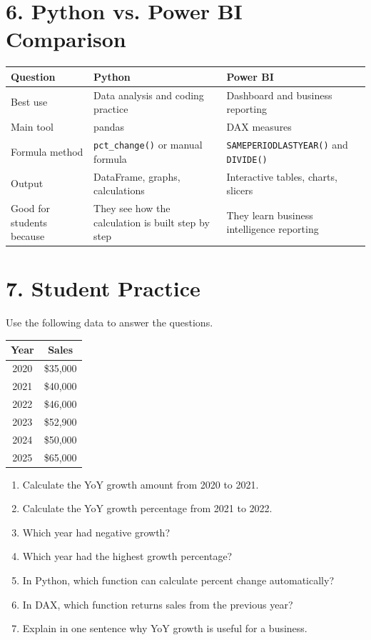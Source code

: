 \documentclass[11pt]{article}
\begin{document}
\section{6. Python vs. Power BI Comparison}
\begin{center}
\begin{tabular}{p{}p{}p{}}
\toprule
\textbf{Question} & \textbf{Python} & \textbf{Power BI} \\
\midrule
Best use & Data analysis and coding practice & Dashboard and business reporting \\
Main tool & pandas & DAX measures \\
Formula method & \texttt{pct\_change()} or manual formula & \texttt{SAMEPERIODLASTYEAR()} and \texttt{DIVIDE()} \\
Output & DataFrame, graphs, calculations & Interactive tables, charts, slicers \\
Good for students because & They see how the calculation is built step by step & They learn business intelligence reporting \\
\bottomrule
\end{tabular}
\end{center}

\section{7. Student Practice}
Use the following data to answer the questions.

\begin{center}
\begin{tabular}{cc}
\toprule
\textbf{Year} & \textbf{Sales} \\
\midrule
2020 & \$35,000 \\
2021 & \$40,000 \\
2022 & \$46,000 \\
2023 & \$52,900 \\
2024 & \$50,000 \\
2025 & \$65,000 \\
\bottomrule
\end{tabular}
\end{center}

\begin{enumerate}[itemsep=4pt]
    \item Calculate the YoY growth amount from 2020 to 2021.
    \item Calculate the YoY growth percentage from 2021 to 2022.
    \item Which year had negative growth?
    \item Which year had the highest growth percentage?
    \item In Python, which function can calculate percent change automatically?
    \item In DAX, which function returns sales from the previous year?
    \item Explain in one sentence why YoY growth is useful for a business.
\end{enumerate}
\end{document}
